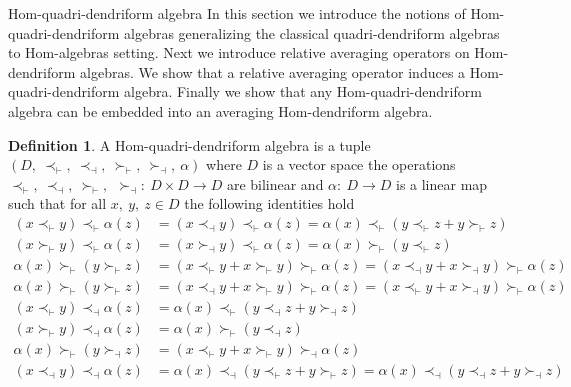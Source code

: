 \documentclass[11pt,twoside,reqno]{amsart}
\makeatletter
\renewcommand{\section}{\@startsection{section}{1}
  \z@{.7\linespacing\@plus\linespacing}{.5\linespacing}
  {\normalfont\upshape\bfseries\centering}}
\theoremstyle{plain}
\theoremstyle{definition}
\newtheorem{definition}[thm]{Definition}
\makeatother
\begin{document}
\section{Hom-quadri-dendriform algebra}
In this section  we introduce the notions of Hom-quadri-dendriform algebras generalizing the classical quadri-dendriform algebras to Hom-algebras setting. Next  we introduce relative averaging
 operators on Hom-dendriform algebras. We show that a relative averaging operator induces a
 Hom-quadri-dendriform algebra. Finally  we show that any Hom-quadri-dendriform algebra can be
 embedded into an averaging Hom-dendriform algebra.
\begin{definition}\label{d8} 
A Hom-quadri-dendriform algebra is a tuple 
$(D,\  \prec_\vdash,\  \prec_\dashv,\  \succ_\vdash,\  \succ_\dashv,\  \alpha) $  where $D$ is a vector space  the operations $\prec_\vdash  ,\ \prec_\dashv ,\  \succ_\vdash,\   \ \succ_\dashv: \ D \times D \to D$ are bilinear  and $\alpha: \ D \to D$ is a linear map  
such that for all $x,\   y  ,\ z \in D$  the following identities hold
\begin{align}
(x \prec_\vdash y) \prec_\vdash \alpha(z) &= (x \prec_\dashv y) \prec_\vdash \alpha(z) = \alpha(x) \prec_\vdash (y \prec_\vdash z + y \succ_\vdash z) \label{Hq1} \\
(x \succ_\vdash y) \prec_\vdash \alpha(z) &= (x \succ_\dashv y) \prec_\vdash \alpha(z) = \alpha(x) \succ_\vdash (y \prec_\vdash z)\label{Hq2} \\
\alpha(x) \succ_\vdash (y \succ_\vdash z)&=(x \prec_\vdash y + x \succ_\vdash y)\succ_\vdash \alpha(z)=(x \prec_\dashv y + x \succ_\dashv y) \succ_\vdash \alpha(z) \label{Hq3} \\
\alpha(x) \succ_\vdash (y \succ_\vdash z)&=(x \prec_\dashv y + x \succ_\vdash y) \succ_\vdash \alpha(z)=(x \prec_\vdash y + x \succ_\dashv y) \succ_\vdash \alpha(z) \label{Hq4} \\
(x \prec_\vdash y) \prec_\dashv \alpha(z)& = \alpha(x) \prec_\vdash (y \prec_\dashv z + y \succ_\dashv z) \label{Hq5} \\
(x \succ_\vdash y) \prec_\dashv \alpha(z)&= \alpha(x) \succ_\vdash (y \prec_\dashv z) \label{Hq6} \\
\alpha(x) \succ_\vdash (y \succ_\dashv z)& = (x \prec_\vdash y + x \succ_\vdash y) \succ_\dashv \alpha(z) \label{Hq7} \\
(x \prec_\dashv y) \prec_\dashv \alpha(z)&=\alpha(x) \prec_\dashv (y \prec_\vdash z + y \succ_\vdash z)=\alpha(x) \prec_\dashv (y \prec_\dashv z + y \succ_\dashv z)\label{Hq8} \\

\end{align}
\end{definition}
\end{document}
